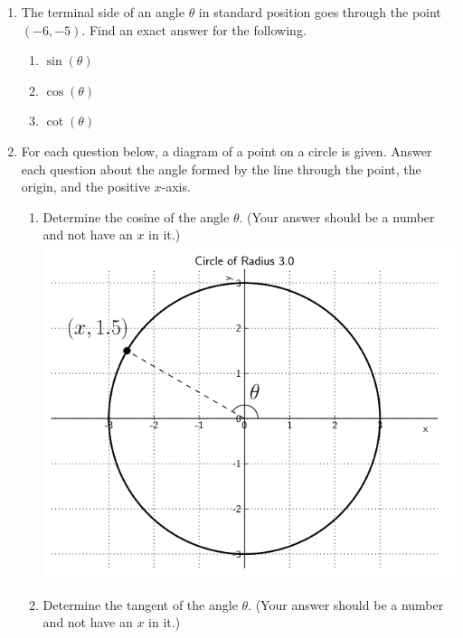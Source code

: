 \begin{enumerate}
\item The terminal side of an angle $\theta$ in standard position goes through the point $(-6,-5).$  Find an exact answer for the following.
\begin{enumerate}
\item $\sin{(\theta)}$\vfill
\item $\cos{(\theta)}$\vfill
\item $\cot{(\theta)}$\vfill

\end{enumerate}

\newpage

\item For each question below, a diagram of a point on a circle is given.  Answer each question about the angle formed by the line through the point, the origin, and the positive $x$-axis.
\begin{enumerate}
\item Determine the cosine of the angle $\theta$.  (Your answer should be a number and not have an $x$ in it.)\\
\includegraphics[scale=.7]{circle1}
\item Determine the tangent of the angle $\theta$.  (Your answer should be a number and not have an $x$ in it.)\\

\end{enumerate}
\end{enumerate}
